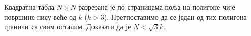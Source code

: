 Квадратна табла $N \times N$ разрезана је по страницама поља на полигоне чије
површине нису веће од $k$ ($k > 3$).
Претпоставимо да се један од тих полигона граничи са свим осталим.
Доказати да је $N<\sqrt{3} k$. 

\solution

